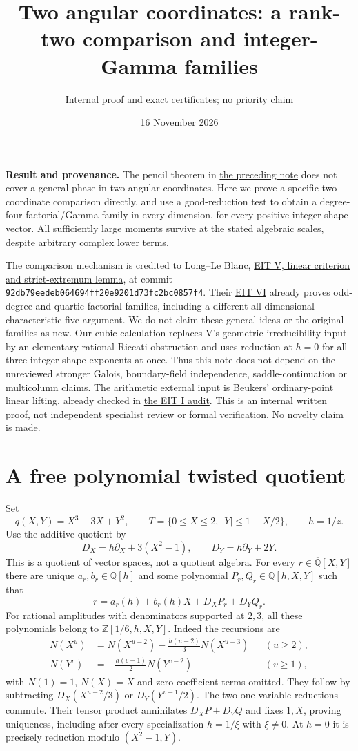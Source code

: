 \documentclass[11pt]{article}
\title{Two angular coordinates: a rank-two comparison and integer-Gamma families}
\author{Internal proof and exact certificates; no priority claim}
\date{16 November 2026}
\newcommand{\Qb}{\overline{\mathbb Q}}
\begin{document}
\maketitle
\noindent\textbf{Result and provenance.}
The pencil theorem in \href{SIMPLEX_PENCILS_AND_AFFINE_LIMITS.tex}{the preceding note}
does not cover a general phase in two angular coordinates. Here we prove a
specific two-coordinate comparison directly, and use a good-reduction test
to obtain a degree-four factorial/Gamma family in every dimension, for
every positive integer shape vector. All sufficiently large moments survive
at the stated algebraic scales, despite arbitrary complex lower terms.

The comparison mechanism is credited to Long--Le Blanc,
\href{https://raw.githubusercontent.com/long-mathematics/exponential-integral-theorem/92db79eedeb064694ff20e9201d73fc2bc0857f4/papers/05-polynomial-flags/polynomial-flag-exponential-periods.tex}{EIT V, linear criterion and strict-extremum lemma},
at commit \texttt{92db79eedeb064694ff20e9201d73fc2bc0857f4}.
Their \href{sources/long-eit-vi-current.tex}{EIT VI} already proves odd-degree
and quartic factorial families, including a different all-dimensional
characteristic-five argument. We do not claim these general ideas or the
original families as new. Our cubic calculation replaces V's geometric
irreducibility input by an elementary rational Riccati obstruction and
uses reduction at $h=0$ for all three integer shape exponents at once.
Thus this note does not depend on the unreviewed stronger Galois,
boundary-field independence, saddle-continuation or multicolumn claims.
The arithmetic external input is Beukers' ordinary-point linear lifting,
already checked in \href{LONG_EIT_AND_FC2_AUDIT.tex}{the EIT I audit}.
This is an internal written proof, not independent specialist review or
formal verification. No novelty claim is made.

\section{A free polynomial twisted quotient}
Set
\[
 q(X,Y)=X^3-3X+Y^2,\qquad
 T=\{0\le X\le2,\ |Y|\le1-X/2\},\qquad h=1/z.
\]
Use the additive quotient by
\[
 D_X=h\partial_X+3(X^2-1),\qquad D_Y=h\partial_Y+2Y.
\]
This is a quotient of vector spaces, not a quotient algebra. For every
$r\in\Qb[X,Y]$ there are unique $a_r,b_r\in\Qb[h]$ and some polynomial
$P_r,Q_r\in\Qb[h,X,Y]$ such that
\[
 r=a_r(h)+b_r(h)X+D_XP_r+D_YQ_r.                 \tag{1}
\]
For rational amplitudes with denominators supported at $2,3$, all these
polynomials belong to $\mathbb Z[1/6,h,X,Y]$. Indeed the recursions are
\begin{align*}
 N(X^u)&=N(X^{u-2})-\frac{h(u-2)}3N(X^{u-3})&& (u\ge2),\\
 N(Y^v)&=-\frac{h(v-1)}2N(Y^{v-2})&& (v\ge1),
\end{align*}
with $N(1)=1$, $N(X)=X$ and zero-coefficient terms omitted. They follow by
subtracting $D_X(X^{u-2}/3)$ or $D_Y(Y^{v-1}/2)$. The two one-variable
reductions commute. Their tensor product annihilates $D_XP+D_YQ$ and fixes
$1,X$, proving uniqueness, including after every specialization $h=1/\xi$
with $\xi\ne0$. At $h=0$ it is precisely reduction modulo
$(X^2-1,Y)$.
\end{document}
